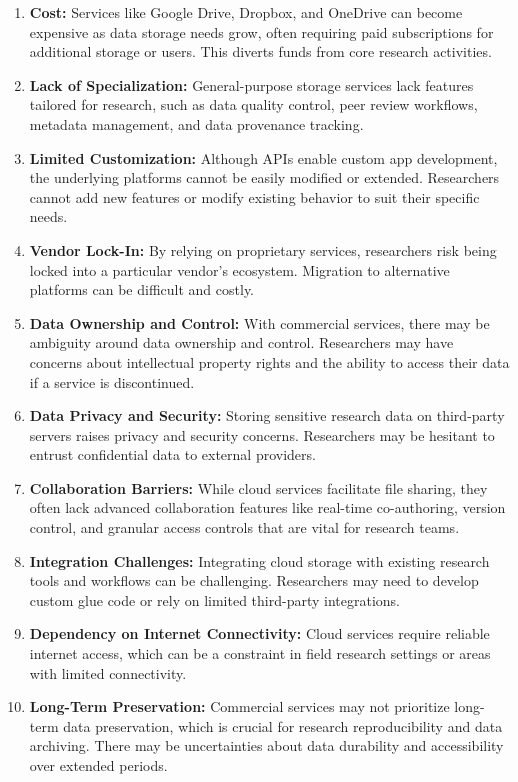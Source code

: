 \documentclass[conference]{IEEEtran}
\begin{document}
\begin{enumerate}
\item \textbf{Cost:} Services like Google Drive, Dropbox, and OneDrive can become expensive as data storage needs grow, often requiring paid subscriptions for additional storage or users. This diverts funds from core research activities.

\item \textbf{Lack of Specialization:} General-purpose storage services lack features tailored for research, such as data quality control, peer review workflows, metadata management, and data provenance tracking.

\item \textbf{Limited Customization:} Although APIs enable custom app development, the underlying platforms cannot be easily modified or extended. Researchers cannot add new features or modify existing behavior to suit their specific needs.

\item \textbf{Vendor Lock-In:} By relying on proprietary services, researchers risk being locked into a particular vendor's ecosystem. Migration to alternative platforms can be difficult and costly.

\item \textbf{Data Ownership and Control:} With commercial services, there may be ambiguity around data ownership and control. Researchers may have concerns about intellectual property rights and the ability to access their data if a service is discontinued.

\item \textbf{Data Privacy and Security:} Storing sensitive research data on third-party servers raises privacy and security concerns. Researchers may be hesitant to entrust confidential data to external providers.

\item \textbf{Collaboration Barriers:} While cloud services facilitate file sharing, they often lack advanced collaboration features like real-time co-authoring, version control, and granular access controls that are vital for research teams.

\item \textbf{Integration Challenges:} Integrating cloud storage with existing research tools and workflows can be challenging. Researchers may need to develop custom glue code or rely on limited third-party integrations.

\item \textbf{Dependency on Internet Connectivity:} Cloud services require reliable internet access, which can be a constraint in field research settings or areas with limited connectivity.

\item \textbf{Long-Term Preservation:} Commercial services may not prioritize long-term data preservation, which is crucial for research reproducibility and data archiving. There may be uncertainties about data durability and accessibility over extended periods.
\end{enumerate}
\end{document}
